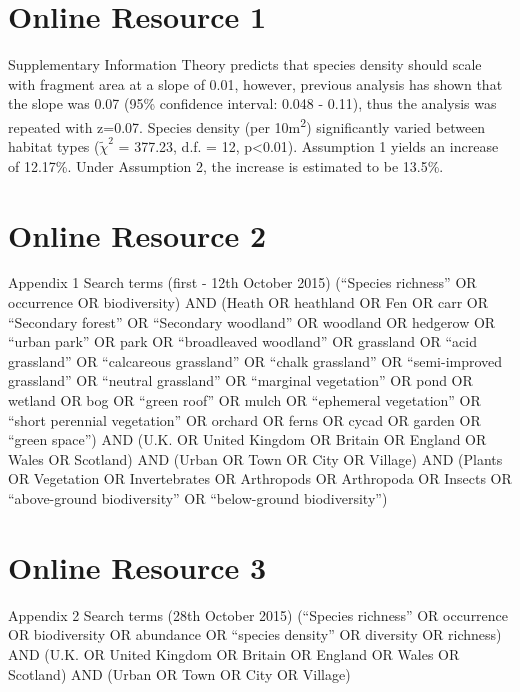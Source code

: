 \ifappendixStyle %
\else
\section*{Online Resource 1}
\fi

Supplementary Information
Theory predicts that species density should scale with fragment area at a slope of 0.01, however, previous analysis has shown that the slope was 0.07 (95\% confidence interval: 0.048 - 0.11), thus the analysis was repeated with z=0.07.  Species density (per 10m\textsuperscript{2}) significantly varied between habitat types ($\tilde{\chi}^2$ = 377.23, d.f. = 12, p<0.01).  Assumption 1 yields an increase of 12.17\%. Under Assumption 2, the increase is estimated to be 13.5\%.

\ifappendixStyle %
\else
\newpage
\section*{Online Resource 2}
\fi

Appendix 1
Search terms (first - 12th October 2015)
(``Species richness'' OR occurrence OR biodiversity) AND (Heath OR heathland OR Fen OR carr OR ``Secondary forest'' OR ``Secondary woodland'' OR woodland OR hedgerow OR ``urban park'' OR park OR ``broadleaved woodland'' OR grassland OR ``acid grassland'' OR ``calcareous grassland'' OR ``chalk grassland'' OR ``semi-improved grassland'' OR ``neutral grassland'' OR ``marginal vegetation'' OR pond OR wetland OR bog OR ``green roof'' OR mulch OR ``ephemeral vegetation'' OR ``short perennial vegetation'' OR orchard OR ferns OR cycad OR garden OR ``green space'') AND (U.K. OR United Kingdom OR Britain OR England OR Wales OR Scotland) AND (Urban OR Town OR City OR Village) AND (Plants OR Vegetation OR Invertebrates OR Arthropods OR Arthropoda OR Insects OR ``above-ground biodiversity'' OR ``below-ground biodiversity'')

\ifappendixStyle %
\else
\newpage
\section*{Online Resource 3}
\fi

Appendix 2
Search terms (28th October 2015)
(``Species richness'' OR occurrence OR biodiversity OR abundance OR ``species density'' OR diversity OR richness) AND (U.K. OR United Kingdom OR Britain OR England OR Wales OR Scotland) AND (Urban OR Town OR City OR Village)

